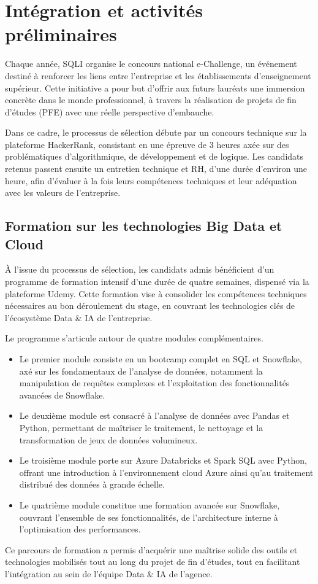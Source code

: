 \section{Intégration et activités préliminaires}
Chaque année, SQLI organise le concours national e-Challenge, un événement destiné à renforcer les liens entre l’entreprise et les établissements d’enseignement supérieur. Cette initiative a pour but d’offrir aux futurs lauréats une immersion concrète dans le monde
professionnel, à travers la réalisation de projets de fin d’études (PFE) avec une réelle perspective d’embauche.

Dans ce cadre, le processus de sélection débute par un concours technique sur la plateforme HackerRank, consistant en une épreuve de 3 heures axée sur des problématiques
d’algorithmique, de développement et de logique. Les candidats retenus passent ensuite un entretien technique et RH, d’une durée d’environ une heure, afin d’évaluer à la
fois leurs compétences techniques et leur adéquation avec les valeurs de l’entreprise.
\subsection{Formation sur les technologies Big Data et Cloud }
À l'issue du processus de sélection, les candidats admis bénéficient d'un programme de formation intensif d'une durée de quatre semaines, dispensé via la plateforme Udemy. Cette formation vise à consolider les compétences techniques nécessaires au bon déroulement du stage, en couvrant les technologies clés de l'écosystème Data \& IA de l'entreprise.

Le programme s'articule autour de quatre modules complémentaires. 
\begin{itemize}
    \item Le premier module consiste en un bootcamp complet en SQL et Snowflake, axé sur les fondamentaux de l'analyse de données, notamment la manipulation de requêtes complexes et l'exploitation des fonctionnalités avancées de Snowflake.
    \item Le deuxième module est consacré à l'analyse de données avec Pandas et Python, permettant de maîtriser le traitement, le nettoyage et la transformation de jeux de données volumineux.
    \item Le troisième module porte sur Azure Databricks et Spark SQL avec Python, offrant une introduction à l'environnement cloud Azure ainsi qu'au traitement distribué des données à grande échelle.
    \item Le quatrième module constitue une formation avancée sur Snowflake, couvrant l'ensemble de ses fonctionnalités, de l'architecture interne à l'optimisation des performances.
\end{itemize}
Ce parcours de formation a permis d'acquérir une maîtrise solide des outils et technologies mobilisés tout au long du projet de fin d'études, tout en facilitant l'intégration au sein de l'équipe Data \& IA de l'agence.

